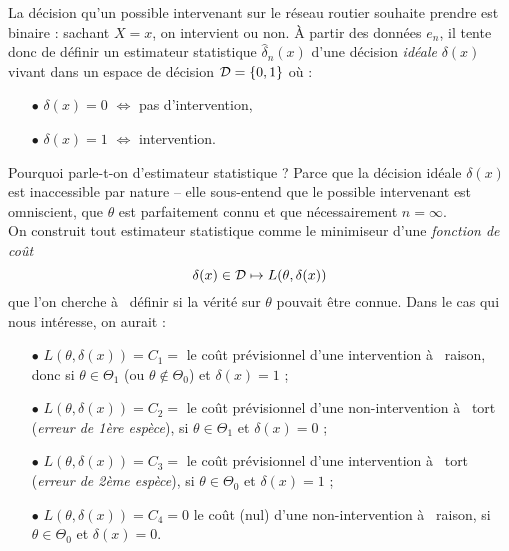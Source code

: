 La décision qu'un possible intervenant sur le réseau routier souhaite prendre est binaire : sachant $X=x$, on intervient ou non. \`A partir des données $e_n$, il tente donc de définir un estimateur statistique $\hat{\delta}_n(x)$ d'une décision {\it idéale} $\delta(x)$ vivant dans un espace de décision ${\cal{D}}=\{0,1\}$ où : \\

\begin{itemize}
\item[$\bullet$] $\delta(x) = 0$ $\Leftrightarrow$ pas d'intervention, 
\item[$\bullet$] $\delta(x)=1 $ $\Leftrightarrow$ intervention. \\
\end{itemize}


Pourquoi parle-t-on d'estimateur statistique ? Parce que la décision idéale $\delta(x)$ est inaccessible par nature -- elle sous-entend que le possible intervenant est omniscient, que $\theta$ est parfaitement connu et que nécessairement $n=\infty$. \\

 On construit tout estimateur statistique comme le minimiseur d'une {\it fonction de coût} $$\delta(x)\in{\cal{D}}\mapsto L(\theta,\delta(x))$$ que l'on cherche à  définir si la vérité sur $\theta$ pouvait être connue. Dans le cas qui nous intéresse, on aurait : \\
 
\begin{itemize}
\item[$\bullet$] $L(\theta,\delta(x))=C_1 =$ le coût prévisionnel d'une intervention à  raison, donc si $\theta\in\Theta_1$ (ou $\theta\notin\Theta_0$) et $\delta(x)=1$ ; \\

\item[$\bullet$] $L(\theta,\delta(x))=C_2 = $ le coût prévisionnel d'une non-intervention à  tort ({\it erreur de 1ère espèce}),  si $\theta\in\Theta_1$ et $\delta(x)=0$ ; \\

\item[$\bullet$] $L(\theta,\delta(x))=C_3 = $ le coût prévisionnel d'une intervention à  tort ({\it erreur de 2ème espèce}), si $\theta\in\Theta_0$ et $\delta(x)=1$ ; \\

\item[$\bullet$] $L(\theta,\delta(x))=C_4 = 0 $ le coût (nul) d'une non-intervention à  raison, si  $\theta\in\Theta_0$ et $\delta(x)=0$. \\
\end{itemize}

